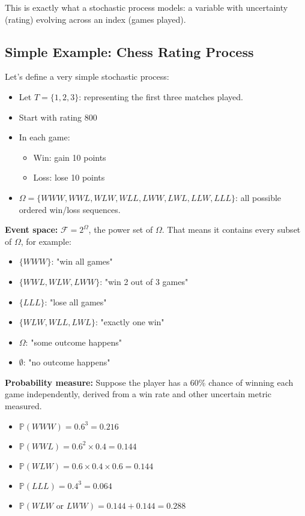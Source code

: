 \documentclass[10pt]{article}
\begin{document}
	This is exactly what a stochastic process models: a variable with uncertainty (rating) evolving across an index (games played).
	
	\subsection*{Simple Example: Chess Rating Process}
	Let’s define a very simple stochastic process:
	\begin{itemize}
		\item Let \( T = \{1, 2, 3\} \): representing the first three matches played.
		\item Start with rating 800
		\item In each game:
		\begin{itemize}
			\item Win: gain 10 points
			\item Loss: lose 10 points
		\end{itemize}
		\item \( \Omega = \{WWW, WWL, WLW, WLL, LWW, LWL, LLW, LLL\} \): all possible ordered win/loss sequences.
	\end{itemize}
	
	\textbf{Event space:} \( \mathcal{F} = 2^\Omega \), the power set of \( \Omega \). That means it contains every subset of \( \Omega \), for example:
	\begin{itemize}		
		\item \( \{WWW\} \): "win all games"
		\item \( \{WWL, WLW, LWW\} \): "win 2 out of 3 games"
		\item \( \{LLL\} \): "lose all games"
		\item \( \{WLW, WLL, LWL\} \): "exactly one win"
		\item \( \Omega \): "some outcome happens"
		\item \( \emptyset \): "no outcome happens"
	\end{itemize}
	
	\textbf{Probability measure:}
	Suppose the player has a 60\% chance of winning each game independently, derived from a win rate and other uncertain metric measured.
	\begin{itemize}
		\item \( \mathbb{P}(WWW) = 0.6^3 = 0.216 \)
		\item \( \mathbb{P}(WWL) = 0.6^2 \times 0.4 = 0.144 \)
		\item \( \mathbb{P}(WLW) = 0.6 \times 0.4 \times 0.6 = 0.144 \)
		\item \( \mathbb{P}(LLL) = 0.4^3 = 0.064 \)
		\item \( \mathbb{P}(WLW \text{ or } LWW) = 0.144 + 0.144 = 0.288 \)
	\end{itemize}
	
\end{document}
